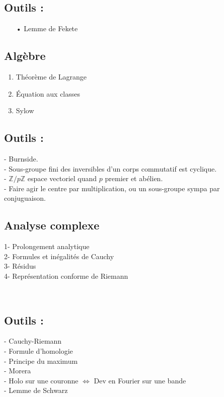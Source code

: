 \documentclass[12pt,a4paper]{article}
\begin{document}
\subsection*{Outils :}
\begin{itemize}
\item[•] Lemme de Fekete
\end{itemize}



\newpage
\begin{center}
\section*{Algèbre} 
\end{center}

\begin{enumerate}
\item Théorème de Lagrange
\item Équation aux classes
\item Sylow
\end{enumerate}
\subsection*{Outils :}
- Burnside. \\
- Sous-groupe fini des inversibles d'un corps commutatif est cyclique. \\
- $\mathbb{Z}/p\mathbb{Z}$ espace vectoriel quand $p$ premier et abélien. \\
- Faire agir le centre par multiplication, ou un sous-groupe sympa par conjuguaison.




\newpage
\begin{center}
\section*{Analyse complexe} 
\end{center}

1- Prolongement analytique \\

2- Formules et inégalités de Cauchy \\

3- Résidus \\

4- Représentation conforme de Riemann

~\\

\subsection*{Outils :}
- Cauchy-Riemann \\

- Formule d'homologie \\

- Principe du maximum \\

- Morera \\

- Holo sur une couronne $\Leftrightarrow$ Dev en Fourier sur une bande \\

- Lemme de Schwarz \\
\end{document}

